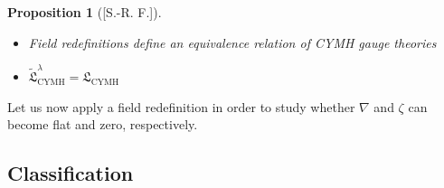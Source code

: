 \documentclass[hyperref={pdfpagelabels=false}]{beamer}
\theoremstyle{plain}
\newtheorem{proposition}[theorem]{Proposition}
\theoremstyle{remark}
\begin{document}
{\begin{frame}
\begin{proposition}[{[S.-R. F.]}]
\begin{itemize}
	\item Field redefinitions define an equivalence relation of CYMH gauge theories
	\item $\widetilde{\mathfrak{L}}^\lambda_{\mathrm{CYMH}} = \mathfrak{L}_{\mathrm{CYMH}}$
\end{itemize}
\end{proposition}
\pause
Let us now apply a field redefinition in order to study whether $\nabla$ and $\zeta$ can become flat and zero, respectively.
\end{frame}
}

\subsection{Classification}
\end{document}
